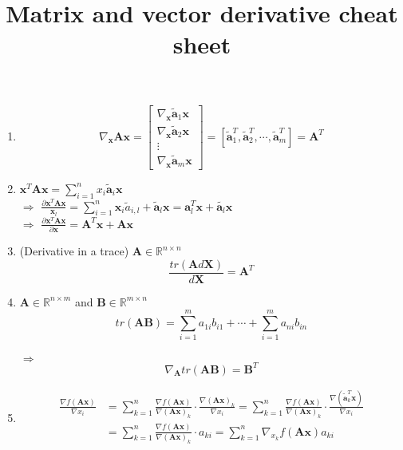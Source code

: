 \documentclass[onecolumn]{IEEEtran}
\begin{document}
	\title{Matrix and vector derivative cheat sheet}
	\author{
	}
	\maketitle
 \begin{enumerate}
 	\item \[\nabla_{\mathbf{x}}\mathbf{Ax}=\left[\begin{matrix}
 		\nabla_{\mathbf{x}}\tilde{\mathbf{a}}_1\mathbf{x}\\\nabla_{\mathbf{x}}\tilde{\mathbf{a}}_2\mathbf{x}\\\vdots\\\nabla_{\mathbf{x}}\tilde{\mathbf{a}}_m\mathbf{x}
 	\end{matrix}\right]=[\tilde{\mathbf{a}}_1^T,\tilde{\mathbf{a}}_2^T,\cdots,\tilde{\mathbf{a}}_m^T]=\mathbf{A}^T\]
 \item $\mathbf{x}^T\mathbf{Ax}=\sum\limits_{i=1}^nx_i\tilde{\mathbf{a}}_i\mathbf{x}$\\
 $\Rightarrow$ $\frac{\partial \mathbf{x}^T\mathbf{Ax}}{\mathbf{x}_l}=\sum_{i=1}^n\mathbf{x}_i\tilde{a}_{i,l}+\tilde{\mathbf{a}}_l\mathbf{x}=\mathbf{a}_l^T\mathbf{x}+\tilde{\mathbf{a}_l}\mathbf{x}$\\
 $\Rightarrow$ $\frac{\partial\mathbf{x}^T\mathbf{Ax}}{\partial \mathbf{x}}=\mathbf{A}^T\mathbf{x}+\mathbf{Ax}$
 \item (Derivative in a trace) $\mathbf{A}\in\mathbb{R}^{n\times n}$
 \[\boxed{\frac{tr(\mathbf{A}d\mathbf{X})}{d\mathbf{X}}=\mathbf{A}^T}\]
 \item $\mathbf{A}\in\mathbb{R}^{n\times m}$ and $\mathbf{B}\in\mathbb{R}^{m\times n}$
 \[tr(\mathbf{AB})=\sum\limits_{i=1}^ma_{1i}b_{i1}+\cdots+\sum\limits_{i=1}^ma_{ni}b_{in}\]\\
 $\Rightarrow$
 \[\boxed{\nabla_{\mathbf{A}}tr(\mathbf{AB})=\mathbf{B}^T}\]
 \item \begin{equation}
 	\begin{split}
 		\frac{\nabla f(\mathbf{Ax})}{\nabla x_i}&=\sum\limits_{k=1}^n\frac{\nabla f(\mathbf{Ax})}{\nabla(\mathbf{Ax})_k}\cdot\frac{\nabla(\mathbf{Ax})_k}{\nabla x_i}=\sum\limits_{k=1}^n\frac{\nabla f(\mathbf{Ax})}{\nabla(\mathbf{Ax})_k}\cdot\frac{\nabla(\tilde{\mathbf{a}}_k^T\mathbf{x})}{\nabla x_i}\\
 		&=\sum\limits_{k=1}^n\frac{\nabla f(\mathbf{Ax})}{\nabla(\mathbf{Ax})_k}\cdot a_{ki}=\sum\limits_{k=1}^n\nabla_{x_k}f(\mathbf{Ax})a_{ki}\\

\end{split}
\end{equation}
\end{enumerate}
\end{document}
